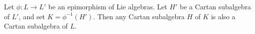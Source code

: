 Let $\phi: L \to L'$ be an epimorphism of Lie algebras. Let $H'$ be a Cartan subalgebra of $L'$, and set $K = \phi^{-1}(H')$. Then any Cartan subalgebra $H$ of $K$ is also a Cartan subalgebra of $L$.
